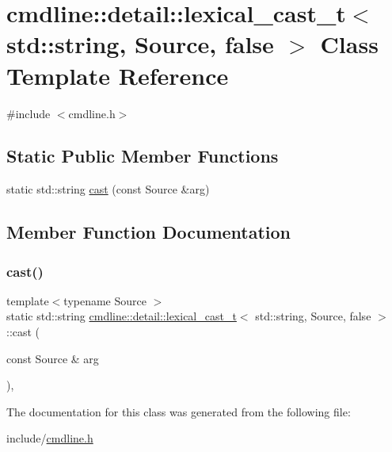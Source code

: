 \hypertarget{classcmdline_1_1detail_1_1lexical__cast__t_3_01std_1_1string_00_01_source_00_01false_01_4}{}\section{cmdline\+::detail\+::lexical\+\_\+cast\+\_\+t$<$ std\+::string, Source, false $>$ Class Template Reference}
\label{classcmdline_1_1detail_1_1lexical__cast__t_3_01std_1_1string_00_01_source_00_01false_01_4}


{\ttfamily \#include $<$cmdline.\+h$>$}

\subsection*{Static Public Member Functions}
\begin{DoxyCompactItemize}
\item 
static std\+::string \mbox{\hyperlink{classcmdline_1_1detail_1_1lexical__cast__t_3_01std_1_1string_00_01_source_00_01false_01_4_af57126abfc4a633919bb63f1425fd69d}{cast}} (const Source \&arg)
\end{DoxyCompactItemize}


\subsection{Member Function Documentation}
\mbox{\label{classcmdline_1_1detail_1_1lexical__cast__t_3_01std_1_1string_00_01_source_00_01false_01_4_af57126abfc4a633919bb63f1425fd69d}} 
\subsubsection{\texorpdfstring{cast()}{cast()}}
{\footnotesize\ttfamily template$<$typename Source $>$ \\
static std\+::string \mbox{\hyperlink{classcmdline_1_1detail_1_1lexical__cast__t}{cmdline\+::detail\+::lexical\+\_\+cast\+\_\+t}}$<$ std\+::string, Source, false $>$\+::cast (\begin{DoxyParamCaption}\item[{const Source \&}]{arg }\end{DoxyParamCaption})\hspace{0.3cm}{\ttfamily [inline]}, {\ttfamily [static]}}



The documentation for this class was generated from the following file\+:\begin{DoxyCompactItemize}
\item 
include/\mbox{\hyperlink{cmdline_8h}{cmdline.\+h}}\end{DoxyCompactItemize}
